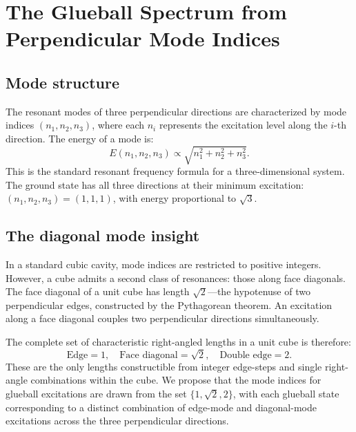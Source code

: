 \documentclass[aps,prd,twocolumn,superscriptaddress,nofootinbib]{revtex4-2}
\begin{document}
\section{The Glueball Spectrum from Perpendicular Mode Indices}
\label{sec:spectrum}

\subsection{Mode structure}

The resonant modes of three perpendicular directions are characterized
by mode indices $(n_1, n_2, n_3)$, where each $n_i$ represents the
excitation level along the $i$-th direction. The energy of a mode is:
\begin{equation}
E(n_1, n_2, n_3) \propto \sqrt{n_1^2 + n_2^2 + n_3^2}.
\label{eq:mode_energy}
\end{equation}
This is the standard resonant frequency formula for a
three-dimensional system. The ground state has all three directions at
their minimum excitation: $(n_1, n_2, n_3) = (1, 1, 1)$, with energy
proportional to $\sqrt{3}$.

\subsection{The diagonal mode insight}

In a standard cubic cavity, mode indices are restricted to positive
integers. However, a cube admits a second class of resonances: those
along face diagonals. The face diagonal of a unit cube has length
$\sqrt{2}$---the hypotenuse of two perpendicular edges, constructed by
the Pythagorean theorem. An excitation along a face diagonal couples
two perpendicular directions simultaneously.

The complete set of characteristic right-angled lengths in a unit cube
is therefore:
\begin{equation}
\text{Edge} = 1, \quad
\text{Face diagonal} = \sqrt{2}, \quad
\text{Double edge} = 2.
\label{eq:lengths}
\end{equation}
These are the only lengths constructible from integer edge-steps and
single right-angle combinations within the cube. We propose that the
mode indices for glueball excitations are drawn from the set
$\{1, \sqrt{2}, 2\}$, with each glueball state corresponding to a
distinct combination of edge-mode and diagonal-mode excitations across
the three perpendicular directions.
\end{document}
